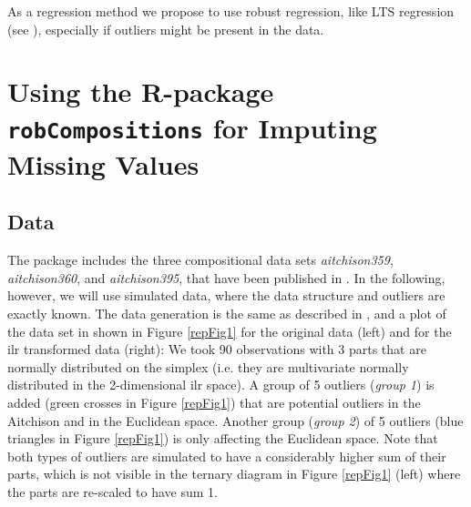 \documentclass{scrartcl}\usepackage[]{graphicx}\usepackage[]{color}
\begin{document}
As a regression method we propose to use robust regression, like LTS regression
(see \cite{Maronna06}), especially if outliers might be present in the data.


\section{Using the R-package \texttt{robCompositions} for Imputing Missing Values}

%

%
%
%
%

\subsection{Data}

The package includes the three compositional data sets \textit{aitchison359},
\textit{aitchison360}, and \textit{aitchison395}, that have been published
in \cite{Aitchison86}. In the following, however, we will use simulated data,
where the data structure and outliers are exactly known.
The data generation is the same as described in \cite{Hron09}, and
a plot of the data set in shown in Figure \ref{repFig1} for the original
data (left) and for the ilr transformed data (right): We took 90 
observations with 3 parts that are normally distributed on the simplex
(i.e. they are multivariate normally distributed in the 2-dimensional
ilr space). A group of 5 outliers (\textit{group 1}) 
is added (green crosses in Figure \ref{repFig1})
that are potential outliers in the Aitchison and in the Euclidean space.
Another group (\textit{group 2}) of 5 outliers (blue triangles in Figure \ref{repFig1})
is only affecting the Euclidean space. Note that both types of outliers are
simulated to have a considerably higher sum of their parts, which is not visible
in the ternary diagram \citep{Aitchison86} in Figure \ref{repFig1} (left) where the parts
are re-scaled to have sum 1.
\end{document}
